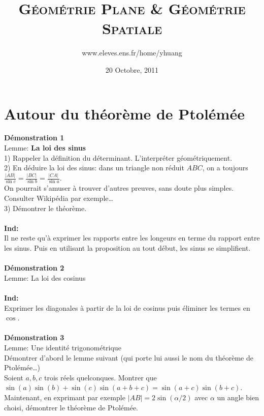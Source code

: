 \documentclass{article}
\begin{document}
\title{\textsc{G\'eom\'etrie Plane \& G\'eom\'etrie Spatiale}}
\author{www.eleves.ens.fr/home/yhuang}
\date{20 Octobre, 2011}

\maketitle

\section{Autour du th\'eor\`eme de Ptol\'em\'ee}

\textbf{D\'emonstration 1}\\
Lemme: \textbf{La loi des sinus}\\
1) Rappeler la d\'efinition du d\'eterminant. L'interpr\'eter g\'eom\'etriquement.\\
2) En d\'eduire la loi des sinus: dans un triangle non r\'eduit $ABC$, on a toujours $\frac{|AB|}{\sin c}=\frac{|BC|}{\sin b}=\frac{|CA|}{\sin a}$.\\
On pourrait s'amuser \`a trouver d'autres preuves, sans doute plus simples. Consulter Wikip\'edia par exemple\dots\\
3) D\'emontrer le th\'eor\`eme.\\
\\
\textbf{Ind:}\\
Il ne reste qu'\`a exprimer les rapports entre les longeurs en terme du rapport entre les sinus. Puis en utilisant la proposition au tout d\'ebut, les sinus se simplifient.\\
\\
\textbf{D\'emonstration 2}\\
Lemme: La loi des cosinus\\
\\
\textbf{Ind:}\\
Exprimer les diagonales \`a partir de la loi de cosinus puis \'eliminer les termes en $\cos$.\\
\\
\textbf{D\'emonstration 3}\\
Lemme: Une identit\'e trigonom\'etrique\\
D\'emontrer d'abord le lemme suivant (qui porte lui aussi le nom du th\'eor\`eme de Ptol\'em\'ee\dots)\\
Soient $a,b,c$ trois r\'eels quelconques. Montrer que $\sin(a)\sin(b)+\sin(c)\sin(a+b+c)=\sin(a+c)\sin(b+c)$.\\
Maintenant, en exprimant par exemple $|AB|=2\sin(\alpha/2)$ avec $\alpha$ un angle bien choisi, d\'emontrer le th\'eor\`eme de Ptol\'em\'ee.\\
\end{document}
